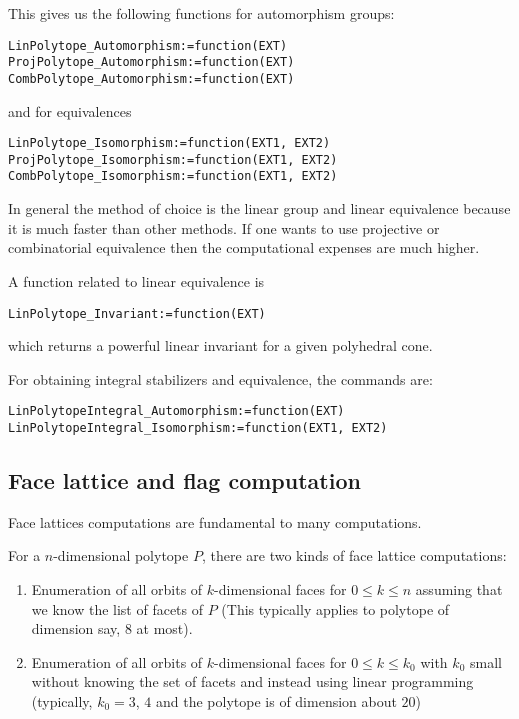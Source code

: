 \documentclass[12pt]{amsart}
\begin{document}
This gives us the following functions for automorphism groups:
\begin{verbatim}
LinPolytope_Automorphism:=function(EXT)
ProjPolytope_Automorphism:=function(EXT)
CombPolytope_Automorphism:=function(EXT)
\end{verbatim}
and for equivalences
\begin{verbatim}
LinPolytope_Isomorphism:=function(EXT1, EXT2)
ProjPolytope_Isomorphism:=function(EXT1, EXT2)
CombPolytope_Isomorphism:=function(EXT1, EXT2)
\end{verbatim}
In general the method of choice is the linear group and linear equivalence
because it is much faster than other methods. If one wants to use projective
or combinatorial equivalence then the computational expenses are much higher.

A function related to linear equivalence is
\begin{verbatim}
LinPolytope_Invariant:=function(EXT)
\end{verbatim}
which returns a powerful linear invariant for a given polyhedral cone.

For obtaining integral stabilizers and equivalence, the commands are:
\begin{verbatim}
LinPolytopeIntegral_Automorphism:=function(EXT)
LinPolytopeIntegral_Isomorphism:=function(EXT1, EXT2)
\end{verbatim}



\subsection{Face lattice and flag computation}

Face lattices computations are fundamental to many computations.

For a $n$-dimensional polytope $P$, there are two kinds of face
lattice computations:
\begin{enumerate}
\item Enumeration of all orbits of $k$-dimensional faces for $0\leq k\leq n$
assuming that we know the list of facets of $P$ (This typically
applies to polytope of dimension say, $8$ at most).
\item Enumeration of all orbits of $k$-dimensional faces for
$0\leq k\leq k_0$ with $k_0$ small without knowing the set of facets
and instead using linear programming (typically, $k_0=3$, $4$ and
the polytope is of dimension about $20$)
\end{enumerate}
\end{document}
